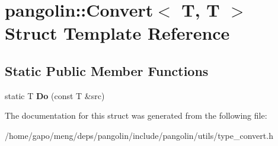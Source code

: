 \hypertarget{structpangolin_1_1_convert_3_01_t_00_01_t_01_4}{}\section{pangolin\+:\+:Convert$<$ T, T $>$ Struct Template Reference}
\label{structpangolin_1_1_convert_3_01_t_00_01_t_01_4}
\subsection*{Static Public Member Functions}
\begin{DoxyCompactItemize}
\item 
static T {\bfseries Do} (const T \&src)\hypertarget{structpangolin_1_1_convert_3_01_t_00_01_t_01_4_afc02e0a0f4b2a192103a209b602aa602}{}\label{structpangolin_1_1_convert_3_01_t_00_01_t_01_4_afc02e0a0f4b2a192103a209b602aa602}

\end{DoxyCompactItemize}


The documentation for this struct was generated from the following file\+:\begin{DoxyCompactItemize}
\item 
/home/gapo/meng/deps/pangolin/include/pangolin/utils/type\+\_\+convert.\+h\end{DoxyCompactItemize}
